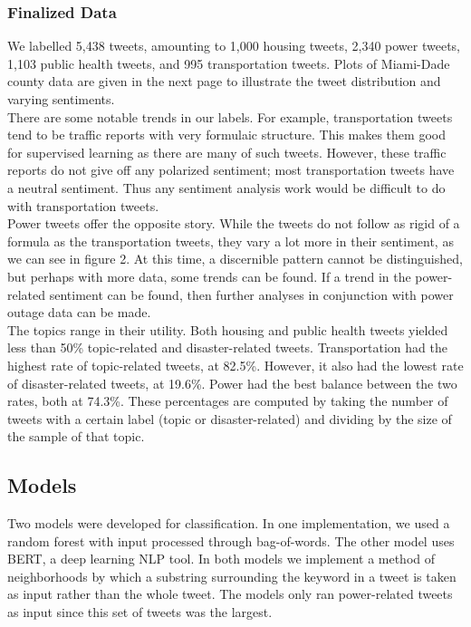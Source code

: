 \documentclass[12pt, a4paper]{article}
\begin{document}
\subsubsection{Finalized Data}
We labelled 5,438 tweets, amounting to 1,000 housing tweets, 2,340 power tweets, 1,103 public health tweets, and 995 transportation tweets. Plots of Miami-Dade county data are given in the next page to illustrate the tweet distribution and varying sentiments.\\

There are some notable trends in our labels. For example, transportation tweets tend to be traffic reports with very formulaic structure. This makes them good for supervised learning as there are many of such tweets. However, these traffic reports do not give off any polarized sentiment; most transportation tweets have a neutral sentiment. Thus any sentiment analysis work would be difficult to do with transportation tweets.\\

Power tweets offer the opposite story. While the tweets do not follow as rigid of a formula as the transportation tweets, they vary a lot more in their sentiment, as we can see in figure 2. At this time, a discernible pattern cannot be distinguished, but perhaps with more data, some trends can be found. If a trend in the power-related sentiment can be found, then further analyses in conjunction with power outage data can be made.\\

The topics range in their utility. Both housing and public health tweets yielded less than 50\% topic-related and disaster-related tweets. Transportation had the highest rate of topic-related tweets, at 82.5\%. However, it also had the lowest rate of disaster-related tweets, at 19.6\%. Power had the best balance between the two rates, both at 74.3\%. These percentages are computed by taking the number of tweets with a certain label (topic or disaster-related) and dividing by the size of the sample of that topic.

\subsection{Models}

Two models were developed for classification. In one implementation, we used a random forest with input processed through bag-of-words. The other model uses BERT, a deep learning NLP tool. In both models we implement a method of neighborhoods by which a substring surrounding the keyword in a tweet is taken as input rather than the whole tweet. The models only ran power-related tweets as input since this set of tweets was the largest.
\end{document}

